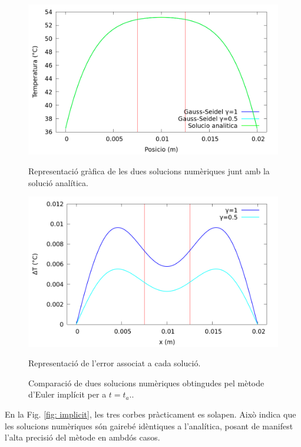 \documentclass[11pt]{article}
\begin{document}
\begin{figure}[H!]
    \centering
    \begin{minipage}{0.45\textwidth}
        \centering
        \includegraphics[width=\linewidth]{Implicit_N/implicit_grafica.png}
        \caption{Representació gràfica de les dues solucions numèriques junt amb la solució analítica.}
        \label{fig: implicit}
    \end{minipage}\hfill
    \begin{minipage}{0.45\textwidth}
        \centering
        \includegraphics[width=\linewidth]{Implicit_N/error_implicit.png}
        \caption{Representació de l'error associat a cada solució.}
        \label{fig: error implicit}
    \end{minipage}
    \caption{Comparació de dues solucions numèriques obtingudes pel mètode d'Euler implícit per a $t=t_a$..}
    \label{fig:overall}
\end{figure}

En la Fig. \ref{fig: implicit}, les tres corbes pràcticament es solapen. Això indica que les solucions numèriques són gairebé idèntiques a l'analítica, posant de manifest l'alta precisió del mètode en ambdós casos.
\end{document}
